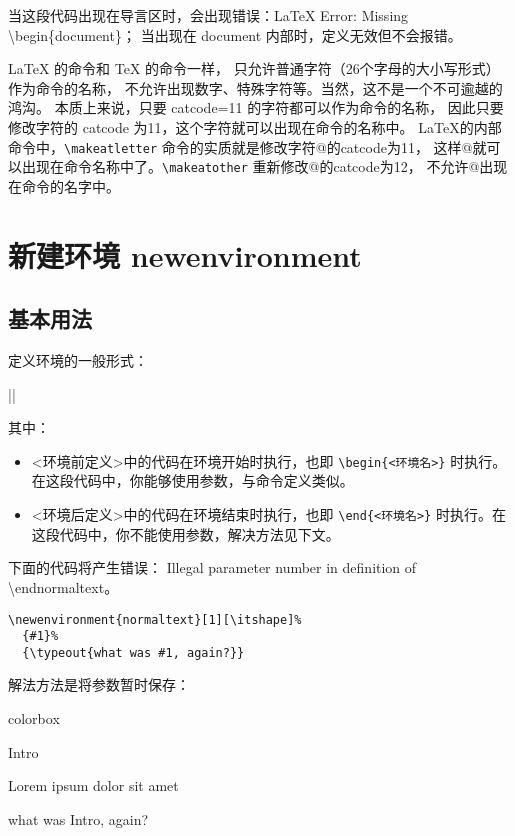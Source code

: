 当这段代码出现在导言区时，会出现错误：{\ttfamily LaTeX Error: Missing \textbackslash begin\{document\}}；
当出现在 document 内部时，定义无效但不会报错。

{\LaTeX} 的命令和 {\TeX} 的命令一样，
只允许普通字符（26个字母的大小写形式）作为命令的名称，
不允许出现数字、特殊字符等。当然，这不是一个不可逾越的鸿沟。
本质上来说，只要 catcode=11 的字符都可以作为命令的名称，
因此只要修改字符的 catcode 为11，这个字符就可以出现在命令的名称中。
LaTeX的内部命令中，\verb|\makeatletter| 命令的实质就是修改字符@的catcode为11，
这样@就可以出现在命令名称中了。\verb|\makeatother| 重新修改@的catcode为12，
不允许@出现在命令的名字中。

\section{新建环境 {\ttfamily newenvironment}}

\subsection{基本用法}

定义环境的一般形式：

|\newenvironment{<环境名>}[<参数个数>][<第一个参数的默认值>]{<环境前定义>}{<环境后定义>}|

其中：
\begin{itemize}
  \item {\ttfamily <环境前定义>}中的代码在环境开始时执行，也即 \verb|\begin{<环境名>}| 时执行。在这段代码中，你能够使用参数，与命令定义类似。
  \item {\ttfamily <环境后定义>}中的代码在环境结束时执行，也即 \verb|\end{<环境名>}| 时执行。在这段代码中，你不能使用参数，解决方法见下文。
\end{itemize}

下面的代码将产生错误： {\ttfamily Illegal parameter number in definition of \textbackslash endnormaltext}。

\begin{verbatim}
\newenvironment{normaltext}[1][\itshape]%
  {#1}%
  {\typeout{what was #1, again?}}
\end{verbatim}

解法方法是将参数暂时保存：

\begin{latexcode}{colorbox}
\newenvironment{normaltext}[1][Intro]%
  {#1\par%
   \newcommand{\foo}{#1}}%
  {\par what was \foo, again?}

\begin{normaltext}
Lorem ipsum dolor sit amet
\end{normaltext}
\end{latexcode}

